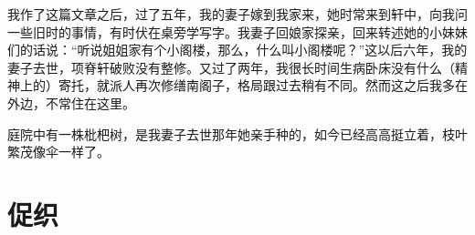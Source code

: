 \documentclass[12pt,UTF-8,openany,a4]{ctexbook}
\begin{document}
\begin{large}
    我作了这篇文章之后，过了五年，我的妻子嫁到我家来，她时常来到轩中，向我问一些旧时的事情，有时伏在桌旁学写字。我妻子回娘家探亲，回来转述她的小妹妹们的话说：“听说姐姐家有个小阁楼，那么，什么叫小阁楼呢？”这以后六年，我的妻子去世，项脊轩破败没有整修。又过了两年，我很长时间生病卧床没有什么（精神上的）寄托，就派人再次修缮南阁子，格局跟过去稍有不同。然而这之后我多在外边，不常住在这里。
    
    庭院中有一株枇杷树，是我妻子去世那年她亲手种的，如今已经高高挺立着，枝叶繁茂像伞一样了。
    

\end{large}



\chapter{促织}
\end{document}
